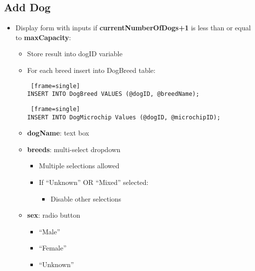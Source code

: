 \documentclass{article}
\begin{document}
\subsection{Add Dog}
\begin{itemize}
    \item Display form with inputs if \textbf{currentNumberOfDogs+1} is less than or equal to \textbf{maxCapacity}:
        \begin{itemize}
        \begin{Verbatim} [frame=single]
INSERT INTO Dog (email,name,description,age,sex,altered,
    surrender_date,surrender_phone,by_animal_control) 
VALUES (@email, @dogName, @description, @age, @sex, 
    @altered, @surrenderDate, @surrenderPhone, 
    @byAnimalControl);
        \end{Verbatim}
    \begin{Verbatim} [frame=single]
        SELECT LAST_INSERT_ID();
    \end{Verbatim}
    \item Store result into dogID variable
    \item For each breed insert into DogBreed table:
        \begin{Verbatim} [frame=single]
INSERT INTO DogBreed VALUES (@dogID, @breedName);
        \end{Verbatim}
        \begin{Verbatim} [frame=single]
INSERT INTO DogMicrochip Values (@dogID, @microchipID);
        \end{Verbatim}
        \item \textbf{dogName}: text box
        \item \textbf{breeds}: multi-select dropdown
        \begin{itemize}
            \item Multiple selections allowed
            \item If ``Unknown'' OR ``Mixed'' selected:
            \begin{itemize}
                \item Disable other selections
            \end{itemize}
        \end{itemize}
        \item \textbf{sex}: radio button
        \begin{itemize}
            \item ``Male''
            \item ``Female''
            \item ``Unknown''

\end{itemize}
\end{itemize}
\end{itemize}
\end{document}
